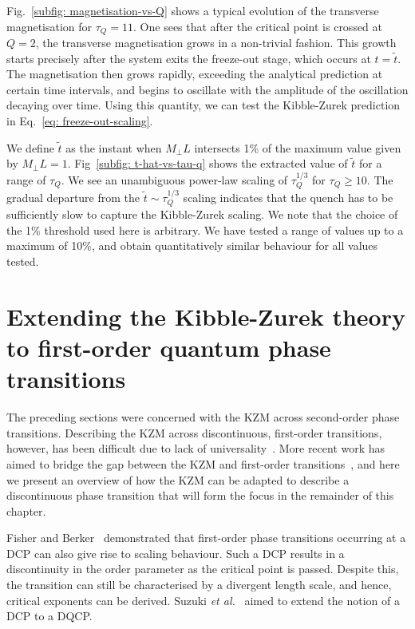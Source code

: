 Fig.~\ref{subfig: magnetisation-vs-Q} shows a typical evolution of the
transverse magnetisation for \(\tau_Q = 11\).
One sees that after the critical point is crossed at \( Q = 2 \), the transverse
magnetisation grows in a non-trivial fashion.
This growth starts precisely after the system exits the freeze-out stage, which
occurs at \(t=\tilde{t}\).
The magnetisation then grows rapidly, exceeding the analytical prediction at
certain time intervals, and begins to oscillate with the amplitude of the
oscillation decaying over time.
Using this quantity, we can test the Kibble-Zurek prediction in
Eq.~\eqref{eq: freeze-out-scaling}.

We define \( \tilde{t} \) as the instant when \(M_\perp L\) intersects 1\% of
the maximum value given by \(M_\perp L = 1\).
Fig~\ref{subfig: t-hat-vs-tau-q} shows the extracted value of \( \tilde{t} \)
for a range of \( \tau_Q \).
We see an unambiguous power-law scaling of \(\tau_Q^{1/3}\) for
\(\tau_Q \geq 10\).
The gradual departure from the \(\tilde{t} \sim \tau_Q^{1/3}\) scaling indicates
that the quench has to be sufficiently slow to capture the Kibble-Zurek scaling.
We note that the choice of the 1\% threshold used here is arbitrary.
We have tested a range of values up to a maximum of 10\%, and obtain
quantitatively similar behaviour for all values tested.

\section{Extending the Kibble-Zurek theory to first-order quantum phase
transitions}
The preceding sections were concerned with the KZM across second-order phase
transitions.
Describing the KZM across discontinuous, first-order transitions, however, has
been difficult due to lack of
universality~\cite{Turban2002,Continentino2004,Nauenberg1975}.
More recent work has aimed to bridge the gap between the KZM and first-order
transitions~\cite{Suzuki2015}, and here we present an overview of how the KZM
can be adapted to describe a discontinuous phase transition that will form the
focus in the remainder of this chapter.

Fisher and Berker~\cite{Fisher1982} demonstrated that first-order phase
transitions occurring at a DCP can also give rise to scaling behaviour.
Such a DCP results in a discontinuity in the order parameter as the critical
point is passed.
Despite this, the transition can still be characterised by a divergent length
scale, and hence, critical exponents can be derived.
Suzuki \textit{et al.}~\cite{Suzuki2015} aimed to extend the notion of a DCP to
a DQCP\@.

